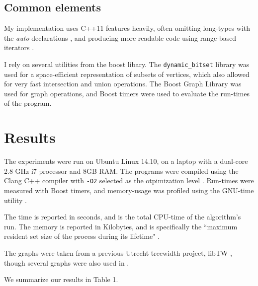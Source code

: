 \documentclass{article}
\begin{document}
\subsection{Common elements}

My implementation uses C++11 features heavily, often omitting long-types with the
\textit{auto} declarations \cite{cppAuto}, 
and producing more readable code using range-based iterators \cite{_range-based}.

I rely on several utilities from the boost libary. The \texttt{dynamic\_bitset} library
was used for a space-efficient representation of subsets of vertices, which also allowed
for very fast intersection and union operations.
The Boost Graph Library was used for graph operations, and Boost timers were
used to evaluate the run-times of the program.




\section{Results}

The experiments were run on Ubuntu Linux 14.10, on a laptop with a dual-core 2.8 GHz i7 processor and 8GB RAM.
The programs were compiled using the Clang C++ compiler with \texttt{-O2} selected as the otpimization level \cite{clangHome}.
Run-times were measured with Boost timers, and memory-usage was profiled using
the GNU-time utility \cite{gnuTime}. 

The time is reported in seconds, and is the total CPU-time of the algorithm's run.
The memory is reported in Kilobytes, and is specifically the
``maximum resident set  size  of  the  process  during  its lifetime" \cite{gnuTime}.

The graphs were taken from a previous Utrecht treewidth project, libTW \cite{javaTW},
though several graphs were also used in \cite{exact}.

We summarize our results in Table 1.

\end{document}
